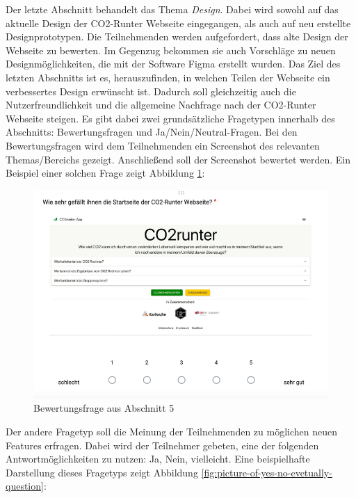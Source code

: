 Der letzte Abschnitt behandelt das Thema \textit{Design}.
Dabei wird sowohl auf das aktuelle Design der CO2-Runter Webseite eingegangen, als auch auf neu erstellte Designprototypen.
Die Teilnehmenden werden aufgefordert, dass alte Design der Webseite zu bewerten.
Im Gegenzug bekommen sie auch Vorschläge zu neuen Designmöglichkeiten, die mit der Software Figma erstellt wurden.
Das Ziel des letzten Abschnitts ist es, herauszufinden, in welchen Teilen der Webseite ein verbessertes Design erwünscht ist.
Dadurch soll gleichzeitig auch die Nutzerfreundlichkeit und die allgemeine Nachfrage nach der CO2-Runter Webseite steigen.
Es gibt dabei zwei grundsätzliche Fragetypen innerhalb des Abschnitts: Bewertungsfragen und Ja/Nein/Neutral-Fragen.
Bei den Bewertungsfragen wird dem Teilnehmenden ein Screenshot des relevanten Themas/Bereichs gezeigt.
Anschließend soll der Screenshot bewertet werden.
Ein Beispiel einer solchen Frage zeigt Abbildung \ref{fig:picture-of-evaluation-question}:

\begin{figure}[H]
    \centering
    \includegraphics[width=1\textwidth]{images/05/picture_of_evaluation_question}
    \caption{Bewertungsfrage aus Abschnitt 5}
    \label{fig:picture-of-evaluation-question}
\end{figure}

Der andere Fragetyp soll die Meinung der Teilnehmenden zu möglichen neuen Features erfragen.
Dabei wird der Teilnehmer gebeten, eine der folgenden Antwortmöglichkeiten zu nutzen:
Ja, Nein, vielleicht.
Eine beispielhafte Darstellung dieses Fragetyps zeigt Abbildung \ref{fig:picture-of-yes-no-evetually-question}:

